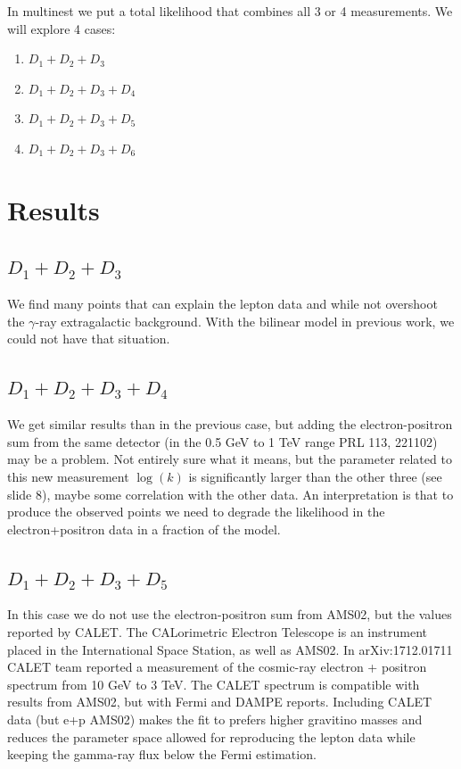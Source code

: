 \documentclass[a4paper,11pt]{article}
\begin{document}
In multinest we put a total likelihood that combines all 3 or 4 measurements. We will explore 4 cases:
\begin{enumerate}
\item $D_1 + D_2 + D_3$
\item $D_1 + D_2 + D_3 + D_4$
\item $D_1 + D_2 + D_3 + D_5$
\item $D_1 + D_2 + D_3 + D_6$
\end{enumerate}

\section{Results}

\subsection{$D_1 + D_2 + D_3$}

We find many points that can explain the lepton data and while not overshoot the $\gamma$-ray extragalactic background. With the bilinear model in previous work, we could not have that situation.

\subsection{$D_1 + D_2 + D_3 + D_4$}

We get similar results than in the previous case, but adding the electron-positron sum from the same detector (in the 0.5 GeV to 1 TeV range PRL 113, 221102) may be a problem. Not entirely sure what it means, but the parameter related to this new measurement $\log(k)$ is significantly larger than the other three (see slide 8), maybe some correlation with the other data. An interpretation is that to produce the observed points we need to degrade the likelihood in the electron+positron data in a fraction of the model.

\subsection{$D_1 + D_2 + D_3 + D_5$}

In this case we do not use the electron-positron sum from AMS02, but the values reported by CALET. The CALorimetric Electron Telescope is an instrument placed in the International Space Station, as well as AMS02. In arXiv:1712.01711 CALET team reported a measurement of the cosmic-ray electron + positron spectrum from 10 GeV to 3 TeV. The CALET spectrum is compatible with results from AMS02, but with Fermi and DAMPE reports. Including CALET data (but e+p AMS02) makes the fit to prefers higher gravitino masses and reduces the parameter space allowed for reproducing the lepton data while keeping the gamma-ray flux below the Fermi estimation.
\end{document}
